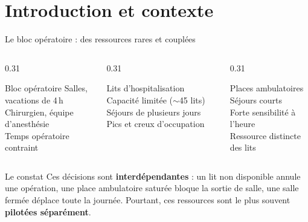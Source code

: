 \section{Introduction et contexte}

\begin{frame}{Le bloc opératoire : des ressources rares et couplées}
  \small
  \begin{columns}[T,onlytextwidth]
    \begin{column}{0.31\textwidth}
      \begin{exampleblock}{\centering Bloc opératoire}
        \centering\footnotesize
        Salles, vacations de 4\,h\\
        Chirurgien, équipe d'anesthésie\\
        Temps opératoire contraint
      \end{exampleblock}
    \end{column}
    \begin{column}{0.31\textwidth}
      \begin{block}{\centering Lits d'hospitalisation}
        \centering\footnotesize
        Capacité limitée ($\sim$45 lits)\\
        Séjours de plusieurs jours\\
        Pics et creux d'occupation
      \end{block}
    \end{column}
    \begin{column}{0.31\textwidth}
      \begin{alertblock}{\centering Places ambulatoires}
        \centering\footnotesize
        Séjours courts\\
        Forte sensibilité à l'heure\\
        Ressource distincte des lits
      \end{alertblock}
    \end{column}
  \end{columns}

  \vspace{0.35cm}
  \begin{alertblock}{Le constat}
    \small Ces décisions sont \textbf{interdépendantes} : un lit non disponible
    annule une opération, une place ambulatoire saturée bloque la sortie de
    salle, une salle fermée déplace toute la journée. Pourtant, ces ressources
    sont le plus souvent \textbf{pilotées séparément}.
  \end{alertblock}
\end{frame}

